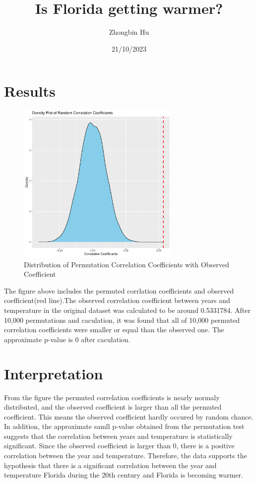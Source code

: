 \documentclass[a4paper,12pt]{article}
\title{Is Florida getting warmer?}
\author{Zhongbin Hu}
\date{21/10/2023}
\begin{document}
  \maketitle

  \section{Results}
  \begin{figure}[h]
    \centering
    \includegraphics[width=0.7\textwidth]{../results/Florida_plot.pdf}
    \caption{Distribution of Permutation Correlation Coefficients with Observed Coefficient}
    \label{Florida}
  \end{figure}

The figure above includes the permuted corrlation coefficients and observed coefficient(red line).The observed correlation coefficient between years and temperature in the original dataset was calculated to be around 0.5331784. 
After 10,000 permutations and caculation, it was found that all of 10,000 permuted correlation coefficients were smaller or equal than the observed one. The approximate p-value is 0 after caculation.

\section{Interpretation}
From the figure the permuted correlation coefficients is nearly normaly distributed, and the observed coefficient is larger than all the permuted coefficient. This means the observed coefficient hardly occured by random chance.
In addition, the approximate samll p-value obtained from the permutation test suggests that the correlation between years and temperature is statistically significant.
Since the observed coefficient is larger than 0, there is a positive correlation between the year and temperature.
Therefore, the data supports the hypothesis that there is a significant correlation between the year and temperature Florida during the 20th century and Florida is becoming warmer.
\end{document}
